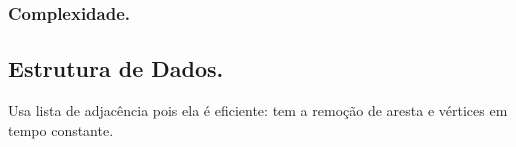 \documentclass[a4paper,12pt]{article}
\begin{document}

\subsubsection{Complexidade.}

\subsection{Estrutura de Dados.}


Usa lista de adjacência pois ela é eficiente: tem a remoção de aresta e vértices em tempo constante.




\nocite{*}


\end{document}
